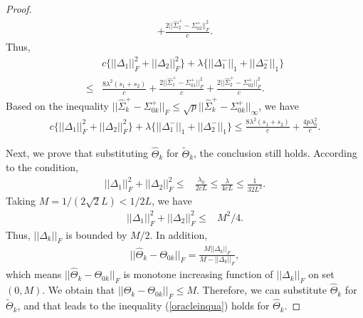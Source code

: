 \documentclass[review]{elsarticle}
\newcommand{\1}{{\bf 1}}
\newcommand{\0}{{\bf 0}}
\newtheorem{proof}{Proof}
\begin{document}
\begin{appendices}
\begin{proof}
\begin{equation}
\begin{split}
+\frac{2||\widehat{\Sigma}_{2}^{+}-\Sigma_{02}^{+}||_{F}^{2}}{c}.
\end{split}
\end{equation}
 Thus,
\begin{equation}\label{equbf40}
\begin{split}
&c\Big\{||\Delta_{1}||_{F}^{2}+||\Delta_{2}||_{F}^{2}\Big\}
+\lambda\Big\{||\Delta_{1}^{-}||_1+||\Delta_{2}^{-}||_1\Big\}\\
\leq &\frac{8\lambda^2(s_1+s_2)}{c}
+\frac{2||\widehat{\Sigma}_{1}^{+}-\Sigma_{01}^{+}||_{F}^{2}}{c}
+\frac{2||\widehat{\Sigma}_{2}^{+}-\Sigma_{02}^{+}||_{F}^{2}}{c}.
\end{split}
\end{equation}
 Based on the inequality $||\widehat{\Sigma}_{k}^{+}-\Sigma_{0k}^{+}||_{F}\leq \sqrt{p}||\widehat{\Sigma}_{k}^{+}-\Sigma_{0k}^{+}||_{\infty}$, we have
\begin{equation}\label{oracleinqua}
\begin{split}
c\Big\{||\Delta_{1}||_{F}^{2}+||\Delta_{2}||_{F}^{2}\Big\}
+\lambda\Big\{||\Delta_{1}^{-}||_1+||\Delta_{2}^{-}||_1\Big\}
\leq  \frac{8\lambda^2(s_1+s_2)}{c}+\frac{4p\lambda_0^2}{c}.
\end{split}
\end{equation}

 Next, we prove that substituting $\widehat{\Theta}_k$ for $\widetilde{\Theta}_k$, the conclusion still holds.
 According to the condition,
\begin{equation}
\begin{split}
||\Delta_{1}||_{F}^{2}+||\Delta_{2}||_{F}^{2}
\leq &\frac{\lambda_0}{2cL} \leq \frac{\lambda}{4cL}\leq\frac{1}{32L^2}.
\end{split}
\end{equation}
 Taking $M=1/(2\sqrt{2}L)<1/2L$, we have
\begin{equation}
\begin{split}
||\Delta_{1}||_{F}^{2}+||\Delta_{2}||_{F}^{2}
\leq &M^2/4.
\end{split}
\end{equation}
 Thus, $||\Delta_{k}||_{F}$ is bounded by $M/2$.
 In addition,
\begin{equation}
\begin{split}
||\widehat{\Theta}_k-\Theta_{0k}||_F=\frac{M||\Delta_k||_F}{M-||\Delta_k||_F},
\end{split}
\end{equation}
 which means $||\widehat{\Theta}_k-\Theta_{0k}||_F$ is monotone increasing function of $||\Delta_k||_F$ on set $(0,M)$. We obtain that $||\widehat{\Theta}_k-\Theta_{0k}||_F\leq M$. Therefore, we can substitute $\widehat{\Theta}_k$ for $\widetilde{\Theta}_k$, and that leads to the inequality (\ref{oracleinqua}) holds for $\widehat{\Theta}_k$.


\end{proof}
\end{appendices}
\end{document}
